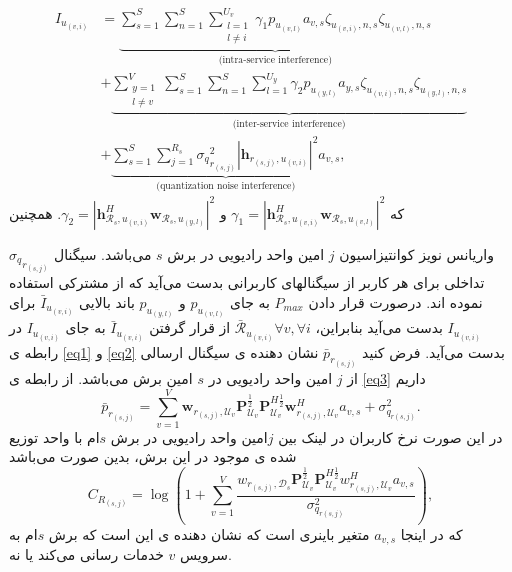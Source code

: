 \begin{equation}
\begin{split}
 I_{u_{(v,i)}} &=
 \underbrace{\sum_{s=1}^{S}\sum_{n=1}^{S}\sum_{\substack{l=1 \\ l\neq i}}^{{U}_v} \gamma_{1}  p_{u_{(v,l)}}a_{v,s}\zeta_{u_(v,i),n,s}\zeta_{u_(v,l),n,s}}_{\text{(intra-service interference)}}\\
&+ \underbrace{\sum_{\substack{y=1 \\ l\neq v}}^{V}\sum_{s=1}^{S}\sum_{n=1}^{S}\sum_{l=1}^{{U}_y} \gamma_{2}  p_{u_{(y,l)}}a_{y,s} \zeta_{u_(v,i),n,s}\zeta_{u_(y,l),n,s}}_{\text{(inter-service interference)}}\\
&+\underbrace{ \sum_{s=1}^{S} \sum_{j=1}^{{R}_s} {\sigma_q}_{r_{(s,j)}}^2 |\boldsymbol{h}_{r_{(s,j)}, u_{(v,i)}}|^2 a_{v,s}}_{\text{(quantization noise interference)}},
\end{split}
\end{equation}
که 
$\gamma_{1} =|\boldsymbol{h}_{\mathcal{R}_s, u_{(v,i)}}^H \boldsymbol{w}_{\mathcal{R}_{s},u_{(v,l)}}|^2$
و 
$\gamma_{2} =|\boldsymbol{h}_{\mathcal{R}_s, u_{(v,i)}}^H \boldsymbol{w}_{\mathcal{R}_{s},u_{(y,l)}}|^2$.
همچنین 

${\sigma_q}_{r_{(s,j)}}$
واریانس نویز کوانتیزاسیون
$j$
امین 
واحد رادیویی در برش $s$ می‌باشد.
سیگنال تداخلی برای هر کاربر از سیگنالهای کاربرانی بدست می‌آید که از  مشترکی استفاده نموده اند.
درصورت قرار دادن $P_{max}$
به جای 
$p_{u_{(v,l)}}$
و 
$p_{u_{(y,l)}}$
باند بالایی  
$\bar{I}_{u_{(v,i)}}$
برای 
$I_{u_{(v,i)}}$
بدست می‌آید
بنابراین،
$\bar{\mathcal{R}}_{u_{(v,i)}} \forall v , \forall i$ 
از قرار گرفتن 
$\bar{I}_{u_{(v,i)}}$
به جای 
$I_{u_{(v,i)}}$
در رابطه ی 
\eqref{eq1} و \eqref{eq2}
بدست می‌آید.
\newline
فرض کنید $\bar{p}_{r_{(s,j)}}$
نشان دهنده ی سیگنال ارسالی از $j$ امین واحد رادیویی در $s$ امین برش می‌باشد.
از رابطه ی \eqref{eq3} داریم
\begin{equation}
\bar{p}_{r_{(s,j)}} = \sum_{v=1}^{V}\boldsymbol{w}_{r_{(s,j)},\mathcal{U}_{v}} \boldsymbol{P}_{\mathcal{U}_v}^{\frac{1}{2}} \boldsymbol{P}_{\mathcal{U}_v}^{H \frac{1}{2}}   \boldsymbol{w}_{r_{(s,j)},\mathcal{U}_{v}}^H a_{v,s} + \sigma_{q_{r(s,j)}}^2.
\end{equation}
در این صورت نرخ کاربران در لینک  بین $j$امین واحد رادیویی در برش $s$ام با واحد توزیع شده ی موجود در این برش، بدین صورت می‌باشد  \cite{simeone2016cloud, 1111}
\begin{equation}
C_{R_{(s,j)}} = \log{(1+\sum_{v=1}^{V}\frac{w_{r_{(s,j)},\mathcal{D}_{s}} \boldsymbol{P}_{\mathcal{U}_v}^{\frac{1}{2}} \boldsymbol{P}_{\mathcal{U}_v}^{H \frac{1}{2}}   w_{r_{(s,j)},\mathcal{U}_{v}}^H a_{v,s}}{ \sigma_{q_{r(s,j)}}^2})},
\end{equation}
که در اینجا 
$a_{v,s}$
متغیر باینری است که نشان دهنده ی این است که برش $s$ام به سرویس $v$ خدمات رسانی می‌کند یا نه.
